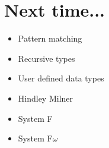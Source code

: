 
\section{Next time...}

\begin{frame}[c]
\begin{itemize}
\item<+-> Pattern matching
\item<+-> Recursive types
\item<+-> User defined data types
\item<+-> Hindley Milner
\item<+-> System F
\item<+-> System F$\omega$
\end{itemize}
\end{frame}

